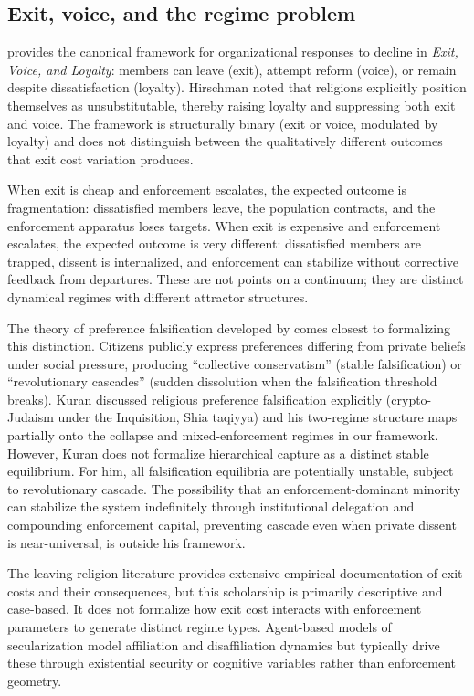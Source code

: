 \documentclass[12pt]{article}
\begin{document}
\subsection{Exit, voice, and the regime problem}

\citet{hirschman1970} provides the canonical framework for organizational responses to decline in \textit{Exit, Voice, and Loyalty}: members can leave (exit), attempt reform (voice), or remain despite dissatisfaction (loyalty). Hirschman noted that religions explicitly position themselves as unsubstitutable, thereby raising loyalty and suppressing both exit and voice. The framework is structurally binary (exit or voice, modulated by loyalty) and does not distinguish between the qualitatively different outcomes that exit cost variation produces.

When exit is cheap and enforcement escalates, the expected outcome is fragmentation: dissatisfied members leave, the population contracts, and the enforcement apparatus loses targets. When exit is expensive and enforcement escalates, the expected outcome is very different: dissatisfied members are trapped, dissent is internalized, and enforcement can stabilize without corrective feedback from departures. These are not points on a continuum; they are distinct dynamical regimes with different attractor structures.

The theory of preference falsification developed by \citet{kuran1995} comes closest to formalizing this distinction. Citizens publicly express preferences differing from private beliefs under social pressure, producing ``collective conservatism'' (stable falsification) or ``revolutionary cascades'' (sudden dissolution when the falsification threshold breaks). Kuran discussed religious preference falsification explicitly (crypto-Judaism under the Inquisition, Shia taqiyya) and his two-regime structure maps partially onto the collapse and mixed-enforcement regimes in our framework. However, Kuran does not formalize hierarchical capture as a distinct stable equilibrium. For him, all falsification equilibria are potentially unstable, subject to revolutionary cascade. The possibility that an enforcement-dominant minority can stabilize the system indefinitely through institutional delegation and compounding enforcement capital, preventing cascade even when private dissent is near-universal, is outside his framework.

The leaving-religion literature \citep{bromley1998,cragun2011,streib2009} provides extensive empirical documentation of exit costs and their consequences, but this scholarship is primarily descriptive and case-based. It does not formalize how exit cost interacts with enforcement parameters to generate distinct regime types. Agent-based models of secularization \citep{gelfand2011,norenzayan2013} model affiliation and disaffiliation dynamics but typically drive these through existential security or cognitive variables rather than enforcement geometry.
\end{document}
